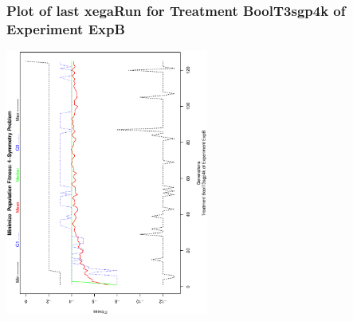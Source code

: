  \begin{frame}
 \frametitle{ Plot of last xegaRun for Treatment BoolT3sgp4k of Experiment ExpB }
 \begin{center}
\includegraphics[width=0.5\textwidth, angle=-90]
{ExpBPlotPopStatsFigure017.eps}
 \end{center}
 \label{report/ExpBPlotPopStatsFigure017.eps}  
 \end{frame}

